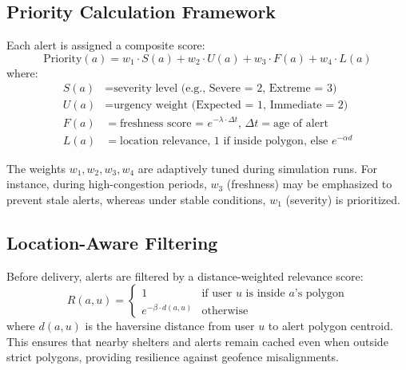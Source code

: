 \documentclass[11pt,twocolumn]{article}
\begin{document}
\subsection{Priority Calculation Framework}

Each alert is assigned a composite score:
\begin{equation}
    \text{Priority}(a) = w_1 \cdot S(a) + w_2 \cdot U(a) + w_3 \cdot F(a) + w_4 \cdot L(a)
\end{equation}
where:
\begin{align}
    S(a) &= \text{severity level (e.g., Severe = 2, Extreme = 3)} \\
    U(a) &= \text{urgency weight (Expected = 1, Immediate = 2)} \\
    F(a) &= \text{freshness score = $e^{-\lambda \cdot \Delta t}$, } \Delta t = \text{age of alert} \\
    L(a) &= \text{location relevance, 1 if inside polygon, else $e^{-\alpha d}$}
\end{align}

The weights $w_1, w_2, w_3, w_4$ are adaptively tuned during simulation runs. For instance, during high-congestion periods, $w_3$ (freshness) may be emphasized to prevent stale alerts, whereas under stable conditions, $w_1$ (severity) is prioritized.

\subsection{Location-Aware Filtering}

Before delivery, alerts are filtered by a distance-weighted relevance score:
\begin{equation}
    R(a,u) = \begin{cases}
        1 & \text{if user $u$ is inside $a$'s polygon} \\
        e^{-\beta \cdot d(a,u)} & \text{otherwise}
    \end{cases}
\end{equation}
where $d(a,u)$ is the haversine distance from user $u$ to alert polygon centroid. This ensures that nearby shelters and alerts remain cached even when outside strict polygons, providing resilience against geofence misalignments.
\end{document}
